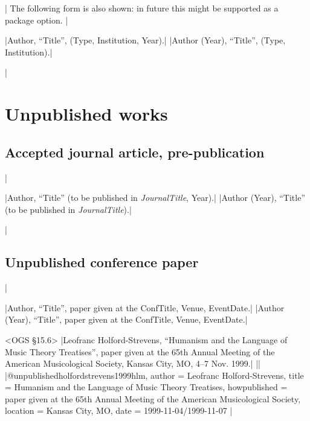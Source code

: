 \documentclass[extrafontsizes,11pt,a4paper,oneside]{memoir}
\newcommand*{\lit}[1]{\textsf{#1}}
\begin{document}
\todoc|
The following form is also shown: in future this might be supported as a package option.
|

\specs
|Author, \enquote{Title}, (Type, Institution, Year).|%
|Author (Year), \enquote{Title}, (Type, Institution).|


\todoc|
\chapter{Unpublished works}\label{sec:unpublished}

\section{Accepted journal article, pre-publication}
|

\specs
|Author, \enquote{Title} (\lit{to be published in} \emph{JournalTitle}, Year).|%
|Author (Year), \enquote{Title} (\lit{to be published in} \emph{JournalTitle}).|

\todoc|
\section{Unpublished conference paper}
|

\specs
|Author, \enquote{Title}, \lit{paper given at the} ConfTitle, Venue, EventDate.|%
|Author (Year), \enquote{Title}, \lit{paper given at the} ConfTitle, Venue, EventDate.|

\bibexample<OGS \S15.6>
|Leofranc Holford-Strevens, \enquote{Humanism and the Language of Music Theory Treatises}, paper given at the 65th Annual Meeting of the American Musicological Society, Kansas City, MO, 4--7 Nov. 1999.|%
||%
|@unpublished{holfordstrevens1999hlm,
  author = {Leofranc Holford-Strevens},
  title = {Humanism and the Language of Music Theory Treatises},
  howpublished = {paper given at the 65th Annual Meeting of the American Musicological Society},
  location = {Kansas City, MO},
  date = {1999-11-04/1999-11-07}
}|
\end{document}
